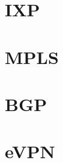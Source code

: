 \documentclass[a4paper,12pt,twoside,twocolumn,landscape]{book}
\begin{document}
\section{IXP}

\section{MPLS}

\section{BGP}

\section{eVPN}


\renewcommand{\listfigurename}{List of {\footnotesize hidden} Figures}
\listoffigures


\renewcommand{\listtablename}{Tables {\footnotesize hidding} on the pages}
\listoftables




\end{document}
